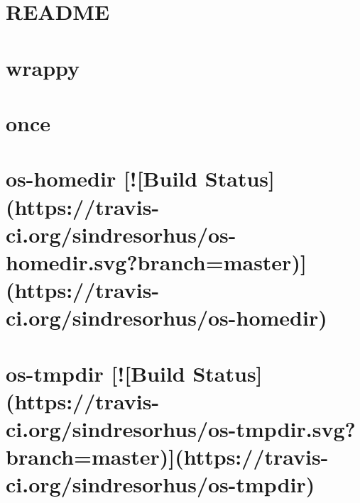 \documentclass[twoside]{book}
\newcommand{\+}{\discretionary{\mbox{\scriptsize$\hookleftarrow$}}{}{}}
\begin{document}
\chapter{R\+E\+A\+D\+M\+E}
\label{md__c_1__users_martin__documents__git_hub_visual_studio__bachelor__wis_r__wis_r_node_modules_gru79f67ba43def301915a1447b00649373}
\hypertarget{md__c_1__users_martin__documents__git_hub_visual_studio__bachelor__wis_r__wis_r_node_modules_gru79f67ba43def301915a1447b00649373}{}

\chapter{wrappy}
\label{md__c_1__users_martin__documents__git_hub_visual_studio__bachelor__wis_r__wis_r_node_modules_gruffde92e06b2d08a618031414cdee1ee3}
\hypertarget{md__c_1__users_martin__documents__git_hub_visual_studio__bachelor__wis_r__wis_r_node_modules_gruffde92e06b2d08a618031414cdee1ee3}{}

\chapter{once}
\label{md__c_1__users_martin__documents__git_hub_visual_studio__bachelor__wis_r__wis_r_node_modules_gruc11370a865f791fe7e65b61129c7cd97}
\hypertarget{md__c_1__users_martin__documents__git_hub_visual_studio__bachelor__wis_r__wis_r_node_modules_gruc11370a865f791fe7e65b61129c7cd97}{}

\chapter{os-\/homedir \mbox{[}!\mbox{[}Build Status\mbox{]}(https\+://travis-\/ci.org/sindresorhus/os-\/homedir.svg?branch=master)\mbox{]}(https\+://travis-\/ci.org/sindresorhus/os-\/homedir)}
\label{md__c_1__users_martin__documents__git_hub_visual_studio__bachelor__wis_r__wis_r_node_modules_gru688bfeb1482d4b5fbe7304708bfc8529}
\hypertarget{md__c_1__users_martin__documents__git_hub_visual_studio__bachelor__wis_r__wis_r_node_modules_gru688bfeb1482d4b5fbe7304708bfc8529}{}

\chapter{os-\/tmpdir \mbox{[}!\mbox{[}Build Status\mbox{]}(https\+://travis-\/ci.org/sindresorhus/os-\/tmpdir.svg?branch=master)\mbox{]}(https\+://travis-\/ci.org/sindresorhus/os-\/tmpdir)}
\label{md__c_1__users_martin__documents__git_hub_visual_studio__bachelor__wis_r__wis_r_node_modules_gru2403589cad1d4f1452788eabf63ae29d}
\hypertarget{md__c_1__users_martin__documents__git_hub_visual_studio__bachelor__wis_r__wis_r_node_modules_gru2403589cad1d4f1452788eabf63ae29d}{}

\end{document}
